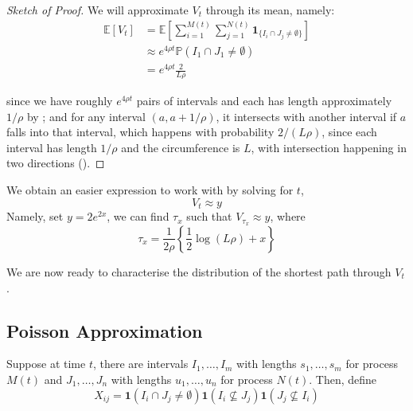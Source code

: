 \documentclass{article}
\begin{document}
\begin{proof}[Sketch of Proof]
    We will approximate $V_t$ through its mean, namely:
    \begin{align*}
        \mathbb{E}[V_t] &= \mathbb{E}\left[\sum_{i=1}^{M(t)}\sum_{j=1}^{N(t)}\mathbf{1}_{\{I_i\cap J_j\neq \emptyset\}}\right] \\
        &\approx e^{4\rho t} \mathbb{P}(I_1\cap J_1\neq \emptyset)\\
        &= e^{4\rho t} \frac{2}{L\rho}
    \end{align*}

    since we have roughly $e^{4\rho t}$ pairs of intervals and each has length approximately $1/\rho$ by ; and for any interval $(a, a+1/\rho)$, it intersects with another interval if $a$ falls into that interval, which happens with probability $2/(L\rho)$, since each interval has length $1/\rho$ and the circumference is $L$, with intersection happening in two directions ().
\end{proof}

We obtain an easier expression to work with by solving for $t$,  
\begin{equation}
    V_t \approx y
\end{equation}
Namely, set $y=2e^{2x}$, we can find $\tau_x$ such that $V_{\tau_x} \approx y$, where
\begin{equation*}
    \tau_{x}={\frac{1}{2\rho}}\left\{{\frac{1}{2}}\log(L\rho)+x\right\}
\end{equation*}

We are now ready to characterise the distribution of the shortest path through $V_t$.  

\subsection{Poisson Approximation}

Suppose at time $t$, there are intervals $I_1, \ldots, I_m$ with lengths $s_1, \ldots, s_m$ for process $M(t)$ and $J_1, \ldots, J_n$ with lengths $u_1, \ldots, u_n$ for process $N(t)$. Then, define
\begin{equation*}
    X_{ij} = \mathbf{1}(I_i\cap J_j\neq \emptyset) \mathbf{1}(I_i \nsubseteq J_j) \mathbf{1}(J_j \nsubseteq I_i)
\end{equation*}
\end{document}
